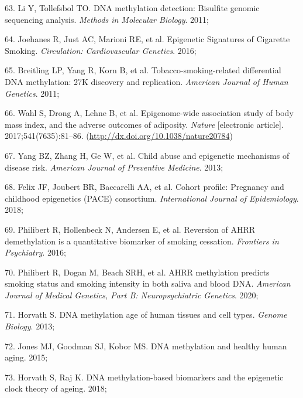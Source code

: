 \documentclass[11pt,oneside]{bristolthesis}
\newenvironment{cslreferences}%
  {}%
  {\par}
\begin{document}
\begin{cslreferences}
\leavevmode\hypertarget{ref-Li2011}{}%
63. Li Y, Tollefsbol TO. DNA methylation detection: Bisulfite genomic sequencing analysis. \emph{Methods in Molecular Biology}. 2011;

\leavevmode\hypertarget{ref-Joehanes2016}{}%
64. Joehanes R, Just AC, Marioni RE, et al. Epigenetic Signatures of Cigarette Smoking. \emph{Circulation: Cardiovascular Genetics}. 2016;

\leavevmode\hypertarget{ref-Breitling2011}{}%
65. Breitling LP, Yang R, Korn B, et al. Tobacco-smoking-related differential DNA methylation: 27K discovery and replication. \emph{American Journal of Human Genetics}. 2011;

\leavevmode\hypertarget{ref-Wahl2017}{}%
66. Wahl S, Drong A, Lehne B, et al. Epigenome-wide association study of body mass index, and the adverse outcomes of adiposity. \emph{Nature} {[}electronic article{]}. 2017;541(7635):81--86. (\url{http://dx.doi.org/10.1038/nature20784})

\leavevmode\hypertarget{ref-Yang2013}{}%
67. Yang BZ, Zhang H, Ge W, et al. Child abuse and epigenetic mechanisms of disease risk. \emph{American Journal of Preventive Medicine}. 2013;

\leavevmode\hypertarget{ref-Felix2018}{}%
68. Felix JF, Joubert BR, Baccarelli AA, et al. Cohort profile: Pregnancy and childhood epigenetics (PACE) consortium. \emph{International Journal of Epidemiology}. 2018;

\leavevmode\hypertarget{ref-Philibert2016}{}%
69. Philibert R, Hollenbeck N, Andersen E, et al. Reversion of AHRR demethylation is a quantitative biomarker of smoking cessation. \emph{Frontiers in Psychiatry}. 2016;

\leavevmode\hypertarget{ref-Philibert2020}{}%
70. Philibert R, Dogan M, Beach SRH, et al. AHRR methylation predicts smoking status and smoking intensity in both saliva and blood DNA. \emph{American Journal of Medical Genetics, Part B: Neuropsychiatric Genetics}. 2020;

\leavevmode\hypertarget{ref-Horvath2013}{}%
71. Horvath S. DNA methylation age of human tissues and cell types. \emph{Genome Biology}. 2013;

\leavevmode\hypertarget{ref-Jones2015}{}%
72. Jones MJ, Goodman SJ, Kobor MS. DNA methylation and healthy human aging. 2015;

\leavevmode\hypertarget{ref-Horvath2018}{}%
73. Horvath S, Raj K. DNA methylation-based biomarkers and the epigenetic clock theory of ageing. 2018;


\end{cslreferences}
\end{document}
